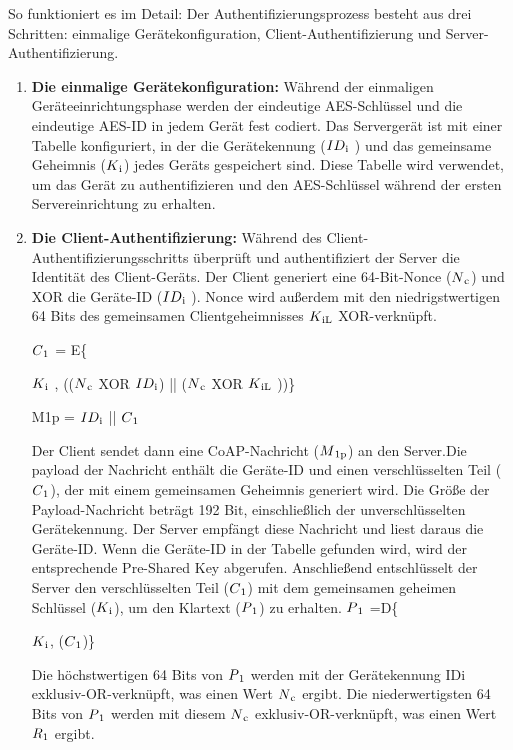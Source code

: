 So funktioniert es im Detail:
Der Authentifizierungsprozess besteht aus drei Schritten: einmalige Gerätekonfiguration, Client-Authentifizierung und Server-Authentifizierung.
\begin{enumerate}
    \item \textbf{Die einmalige Gerätekonfiguration:}
Während der einmaligen Geräteeinrichtungsphase werden der eindeutige AES-Schlüssel und die eindeutige AES-ID in jedem Gerät fest codiert. Das Servergerät ist mit einer Tabelle konfiguriert, in der die Gerätekennung (\(ID\textsubscript{i}\) ) und das gemeinsame Geheimnis (\(K\textsubscript{i}\)) jedes Geräts gespeichert sind. Diese Tabelle wird verwendet, um das Gerät zu authentifizieren und den AES-Schlüssel während der ersten Servereinrichtung zu erhalten.
\item \textbf{Die Client-Authentifizierung:}
Während des Client-Authentifizierungsschritts überprüft und authentifiziert der Server die Identität des Client-Geräts. Der Client generiert eine 64-Bit-Nonce (\(N\textsubscript{c}\)) und XOR die Geräte-ID (\(ID\textsubscript{i}\) ). Nonce wird außerdem mit den niedrigstwertigen 64 Bits des gemeinsamen Clientgeheimnisses \(K\textsubscript{iL}\)  XOR-verknüpft.

\(C\textsubscript{1}\)  = E\{ {\(K\textsubscript{i}\) , ((\(N\textsubscript{c}\)  XOR  \(ID\textsubscript{i}\)) || (\(N\textsubscript{c}\) XOR \(K\textsubscript{iL}\) ))\}\

M1p = \(ID\textsubscript{i}\)  || \(C\textsubscript{1}\) 

Der Client sendet dann eine CoAP-Nachricht (\(M\textsubscript{1p}\)) an den Server.Die payload der Nachricht enthält die Geräte-ID und einen verschlüsselten Teil (\(C\textsubscript{1}\)), der mit einem gemeinsamen Geheimnis generiert wird. Die Größe der Payload-Nachricht beträgt 192 Bit, einschließlich der unverschlüsselten Gerätekennung. Der Server empfängt diese Nachricht und liest daraus die Geräte-ID. Wenn die Geräte-ID in der Tabelle gefunden wird, wird der entsprechende Pre-Shared Key abgerufen. Anschließend entschlüsselt der Server den verschlüsselten Teil (\(C\textsubscript{1}\)) mit dem gemeinsamen geheimen Schlüssel (\(K\textsubscript{i}\)), um den Klartext (\(P\textsubscript{1}\)) zu erhalten.
\(P\textsubscript{1}\) =D\{{\(K\textsubscript{i}\), (\(C\textsubscript{1}\))\}


Die höchstwertigen 64 Bits von \(P\textsubscript{1}\) werden mit der Gerätekennung IDi exklusiv-OR-verknüpft, was einen Wert \(N\textsubscript{c}\) ergibt. Die niederwertigsten 64 Bits von \(P\textsubscript{1}\) werden mit diesem \(N\textsubscript{c}\) exklusiv-OR-verknüpft, was einen Wert\(R\textsubscript{1}\) ergibt.


}}
\end{enumerate}
